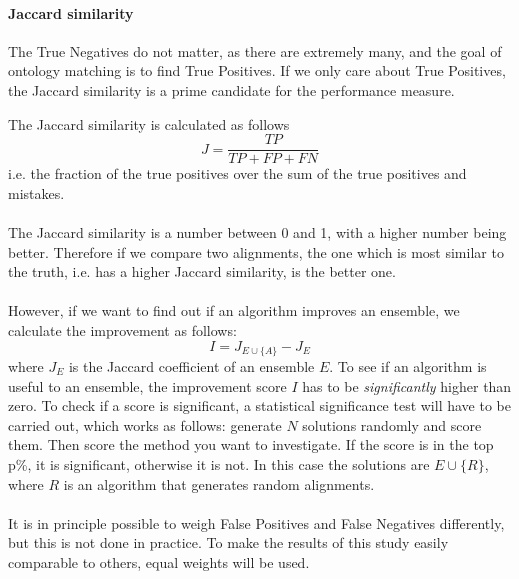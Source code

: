 \documentclass{article}
\begin{document}
 \paragraph{Jaccard similarity}
 The True Negatives do not matter, as there are extremely many, and the goal of ontology matching is to find True Positives. If we only care about True Positives, the Jaccard similarity is a prime candidate for the performance measure.

 The Jaccard similarity is calculated as follows
 \[
 J = \frac{TP}{TP + FP + FN}
 \]
 i.e. the fraction of the true positives over the sum of the true positives and mistakes.
 \paragraph{}
 The Jaccard similarity is a number between 0 and 1, with a higher number being better. Therefore if we compare two alignments, the one which is most similar to the truth, i.e. has a higher Jaccard similarity, is the better one.
 \paragraph{}
 However, if we want to find out if an algorithm improves an ensemble, we calculate the improvement as follows:
 \[
 I = J_{E\cup \{A\}} - J_E
 \]
 where $J_E$ is the Jaccard coefficient of an ensemble $E$.
 To see if an algorithm is useful to an ensemble, the improvement score $I$ has to be \emph{significantly} higher than zero. To check if a score is significant, a statistical significance test will have to be carried out, which works as follows: generate $N$ solutions randomly and score them. Then score the method you want to investigate. If the score is in the top p\%, it is significant, otherwise it is not. In this case the solutions are $E\cup \{R\}$, where $R$ is an algorithm that generates random alignments\cite{fisher1925statistical}.
 \paragraph{}
 It is in principle possible to weigh False Positives and False Negatives differently, but this is not done in practice. To make the results of this study easily comparable to others, equal weights will be used.
 
 
\end{document}
